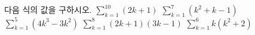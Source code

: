 다음 식의 값을 구하시오.
 $\displaystyle\sum_{k=1}^{10}(2k+1)$
 $\displaystyle\sum_{k=1}^{7}(k^2+k-1)$
 $\displaystyle\sum_{k=1}^{5}(4k^3-3k^2)$
 $\displaystyle\sum_{k=1}^{8}(2k+1)(3k-1)$
 $\displaystyle\sum_{k=1}^{6}k(k^2+2)$

